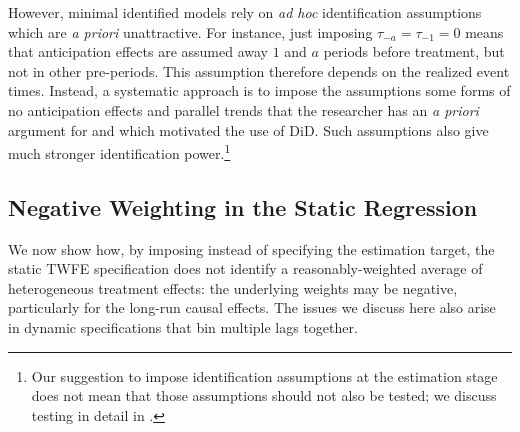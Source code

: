 \documentclass[english,11pt]{article}
\theoremstyle{plain}
\theoremstyle{plain}
\theoremstyle{plain}
\theoremstyle{plain}
\let\ref\Cref
\begin{document}
However, minimal identified models rely on \emph{ad hoc }identification
assumptions which are \emph{a priori }unattractive. For instance,
just imposing $\tau_{-a}=\tau_{-1}=0$ means that anticipation effects
are assumed away $1$ and $a$ periods before treatment, but not in
other pre-periods. This assumption therefore depends on the realized
event times. Instead, a systematic approach is to impose the assumptions
\textemdash{} some forms of no anticipation effects and parallel trends
\textemdash{} that the researcher has an \emph{a priori }argument
for and which motivated the use of DiD. Such assumptions also give
much stronger identification power.\footnote{Our suggestion to impose identification assumptions at the estimation
stage does not mean that those assumptions should not also be tested;
we discuss testing in detail in \ref{subsec:Testing-PTA}.}

\subsection{Negative Weighting in the Static Regression\label{subsec:Negative-Weighting}}

We now show how, by imposing \ref{assu:A3} instead of specifying
the estimation target, the static TWFE specification does not identify
a reasonably-weighted average of heterogeneous treatment effects:
the underlying weights may be negative, particularly for the long-run
causal effects. The issues we discuss here also arise in dynamic specifications
that bin multiple lags together.
\end{document}
